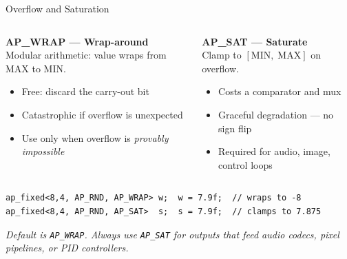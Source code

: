 \documentclass[aspectratio=169,12pt]{beamer}
\begin{document}
\begin{frame}[t,fragile]{Overflow and Saturation}
\vspace{0.05cm}
\begin{columns}[T,totalwidth=\textwidth]
  \colorbox{Orange!10}{\parbox{\dimexpr\linewidth-2\fboxsep\relax}{%
    \vspace{2pt}
    {\color{Orange}\bfseries AP\_WRAP --- Wrap-around}\\[1pt]
    {\footnotesize\color{Navy}
      Modular arithmetic: value wraps from MAX to MIN.}\\[1pt]
    {\footnotesize
    \begin{itemize}\setlength{\itemsep}{1pt}
      \item Free: discard the carry-out bit
      \item Catastrophic if overflow is unexpected
      \item Use only when overflow is \emph{provably impossible}
    \end{itemize}}
    \vspace{1pt}
  }}
  \colorbox{Teal!10}{\parbox{\dimexpr\linewidth-2\fboxsep\relax}{%
    \vspace{2pt}
    {\color{Teal}\bfseries AP\_SAT --- Saturate}\\[1pt]
    {\footnotesize\color{Navy}
      Clamp to $[\text{MIN},\; \text{MAX}]$ on overflow.}\\[1pt]
    {\footnotesize
    \begin{itemize}\setlength{\itemsep}{1pt}
      \item Costs a comparator and mux
      \item Graceful degradation --- no sign flip
      \item Required for audio, image, control loops
    \end{itemize}}
    \vspace{1pt}
  }}
\end{columns}
\vspace{0.02cm}
\begin{lstlisting}
ap_fixed<8,4, AP_RND, AP_WRAP> w;  w = 7.9f;  // wraps to -8
ap_fixed<8,4, AP_RND, AP_SAT>  s;  s = 7.9f;  // clamps to 7.875
\end{lstlisting}
\vspace{0.02cm}
{\footnotesize\color{MidGray}\itshape
  Default is \texttt{AP\_WRAP}.
  Always use \texttt{AP\_SAT} for outputs that feed audio codecs,
  pixel pipelines, or PID controllers.}
\end{frame}
\end{document}
